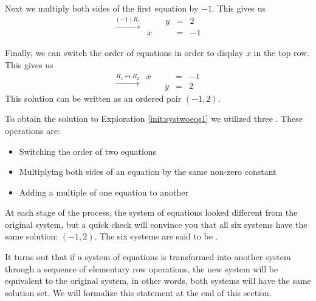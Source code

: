 \documentclass{ximera}
\begin{document}
\begin{exploration}
Next we multiply both sides of the first equation by $-1$. This gives us
\begin{equation*}
\begin{array}{c}
 \xrightarrow{(-1)R_1}\\
 \\
 \end{array}
 \begin{array}{ccccc}
      & &y&=&2\\
      x & &&= &-1
    \end{array}
\end{equation*}    
    
Finally, we can switch the order of equations in order to display $x$ in the top row.  This gives us
\begin{equation*}
\begin{array}{c}
 \xrightarrow{R_1\leftrightarrow R_2}\\
 
 \end{array}
\begin{array}{ccccc}
      x & &&= &-1\\
      & &y&=&2      
    \end{array}
\end{equation*}    
This solution can be written as an ordered pair $(-1, 2)$.  
\end{exploration}

To obtain the solution to Exploration \ref{init:systwoeqs1} we utilized three .  These operations are:
\begin{itemize}
\item Switching the order of two equations
\item Multiplying both sides of an equation by the same non-zero constant
\item Adding a multiple of one equation to another
\end{itemize}
At each stage of the process, the system of equations looked different from the original system, but a quick check will convince you that all six systems have the same solution: $(-1, 2)$.  The six systems are said to be .  


It turns out that if a system of equations is transformed into another system through a sequence of elementary row operations, the new system will be equivalent to the original system, in other words, both systems will have the same solution set.  We will formalize this statement at the end of this section.
\end{document}
